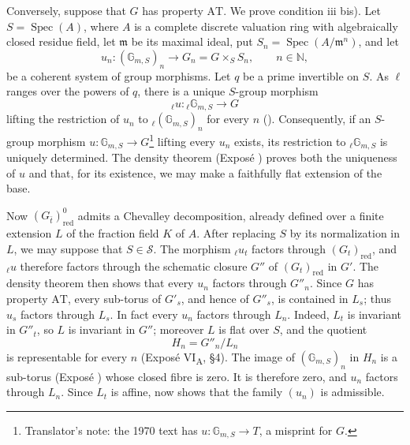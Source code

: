 Conversely, suppose that \(G\) has property \(\mathrm{AT}\). We prove
condition  \textup{iii bis)}. Let \(S=\operatorname{Spec}(A)\),
where \(A\) is a complete discrete valuation ring with algebraically
closed residue field, let \(\mathfrak m\) be its maximal ideal, put
\(S_n=\operatorname{Spec}(A/\mathfrak m^n)\), and let
\[
 u_n:(\mathbb G_{m,S})_n\longrightarrow
 G_n=G\times_S S_n,\qquad n\in\mathbb N,
\]
be a coherent system of group morphisms. Let \(q\) be a prime
invertible on \(S\). As \(\ell\) ranges over the powers of \(q\),
there is a unique \(S\)-group morphism
\[
 {}_\ell u:{}_\ell\mathbb G_{m,S}\longrightarrow G
\]
lifting the restriction of \(u_n\) to
\({}_\ell(\mathbb G_{m,S})_n\) for every \(n\)
(). Consequently, if an \(S\)-group morphism
\(u:\mathbb G_{m,S}\to G\)\footnote{Translator's note: the 1970 text has
\(u:\mathbb G_{m,S}\to T\), a misprint for \(G\).} lifting every \(u_n\) exists, its
restriction to \({}_\ell\mathbb G_{m,S}\) is uniquely determined.
The density theorem (Exposé ) proves both the uniqueness of
\(u\) and that, for its existence, we may make a faithfully flat
extension of the base.

Now \((G_{\bar t})^0_{\mathrm{red}}\) admits a Chevalley decomposition,
already defined over a finite extension \(L\) of the fraction field
\(K\) of \(A\). After replacing \(S\) by its normalization in \(L\),
we may suppose that \(S\in\mathcal S\). The morphism
\({}_\ell u_t\) factors through \((G_t)_{\mathrm{red}}\), and
\({}_\ell u\) therefore factors through the schematic closure
\(G''\) of \((G_t)_{\mathrm{red}}\) in \(G'\). The density theorem
then shows that every \(u_n\) factors through \(G''_n\).
Since \(G\) has property \(\mathrm{AT}\), every sub-torus of \(G'_s\),
and hence of \(G''_s\), is contained in \(L_s\); thus \(u_s\)
factors through \(L_s\). In fact every \(u_n\) factors through
\(L_n\). Indeed, \(L_t\) is invariant in \(G''_t\), so \(L\) is
invariant in \(G''\); moreover \(L\) is flat over \(S\), and the
quotient
\[
  H_n=G''_n/L_n
\]
is representable for every \(n\) (Exposé VI\textsubscript{A},
\S4). The image of \((\mathbb G_{m,S})_n\) in \(H_n\) is a
sub-torus (Exposé ) whose closed fibre is zero. It is therefore
zero, and \(u_n\) factors through \(L_n\). Since \(L_t\) is affine,
 now shows that the family \((u_n)\) is admissible.

